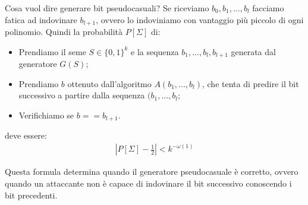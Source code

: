 \noindent Cosa vuol dire generare bit pseudocasuali?  Se riceviamo $b_0, b_1, ..., b_l$ facciamo fatica ad indovinare $b_{l+1}$, ovvero lo indoviniamo con vantaggio più piccolo di ogni polinomio. Quindi la probabilità  $P[\Sigma]$ di:
\begin{itemize}
    \item Prendiamo il seme $S \in \{0, 1\}^k$ e la sequenza $b_1, ..., b_l, b_{l+1}$ generata dal generatore $G(S)$;
    \item Prendiamo $b$ ottenuto dall'algoritmo $A(b_1, ..., b_l)$, che tenta di predire il bit successivo a partire dalla sequenza $(b_1, ..., b_l$;
    \item Verifichiamo se $b == b_{l+1}$.
\end{itemize}

\noindent deve essere:
\begin{align}
    \left|P[\Sigma] - \frac{1}{2} \right| < k^{-\omega(1)}
\end{align}

\noindent Questa formula determina quando il generatore pseudocasuale è corretto, ovvero quando un attaccante non è capace di indovinare il bit successivo conoscendo i bit precedenti. 

